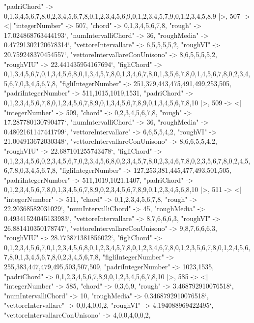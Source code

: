 \documentclass[
]{article}
\begin{document}
\begin{DatasetVerbatim}
    "padriChord" -> {{0,1,3,4,5,6,7,8},{0,2,3,4,5,6,7,8},{0,1,2,3,4,5,6,9},{0,1,2,3,4,5,7,9},{0,1,2,3,4,5,8,9}}
  |>,
  507 -> <|
    "integerNumber" -> 507,
    "chord" -> {0,1,3,4,5,6,7,8},
    "rough" -> 17.024868763444193`,
    "numIntervalliChord" -> 36,
    "roughMedia" -> 0.47291302120678314`,
    "vettoreIntervallare" -> {6,5,5,5,5,2},
    "roughVI" -> 20.759248370454557`,
    "vettoreIntervallareConUnisono" -> {8,6,5,5,5,5,2},
    "roughVIU" -> 22.441435954167694`,
    "figliChord" -> {{0,1,3,4,5,6,7},{0,1,3,4,5,6,8},{0,1,3,4,5,7,8},{0,1,3,4,6,7,8},{0,1,3,5,6,7,8},{0,1,4,5,6,7,8},{0,2,3,4,5,6,7},{0,3,4,5,6,7,8}},
    "figliIntegerNumber" -> {251,379,443,475,491,499,253,505},
    "padriIntegerNumber" -> {511,1015,1019,1531},
    "padriChord" -> {{0,1,2,3,4,5,6,7,8},{0,1,2,4,5,6,7,8,9},{0,1,3,4,5,6,7,8,9},{0,1,3,4,5,6,7,8,10}}
  |>,
  509 -> <|
    "integerNumber" -> 509,
    "chord" -> {0,2,3,4,5,6,7,8},
    "rough" -> 17.287780130790477`,
    "numIntervalliChord" -> 36,
    "roughMedia" -> 0.4802161147441799`,
    "vettoreIntervallare" -> {6,6,5,5,4,2},
    "roughVI" -> 21.004913672030348`,
    "vettoreIntervallareConUnisono" -> {8,6,6,5,5,4,2},
    "roughVIU" -> 22.687101255743478`,
    "figliChord" -> {{0,1,2,3,4,5,6},{0,2,3,4,5,6,7},{0,2,3,4,5,6,8},{0,2,3,4,5,7,8},{0,2,3,4,6,7,8},{0,2,3,5,6,7,8},{0,2,4,5,6,7,8},{0,3,4,5,6,7,8}},
    "figliIntegerNumber" -> {127,253,381,445,477,493,501,505},
    "padriIntegerNumber" -> {511,1019,1021,1407},
    "padriChord" -> {{0,1,2,3,4,5,6,7,8},{0,1,3,4,5,6,7,8,9},{0,2,3,4,5,6,7,8,9},{0,1,2,3,4,5,6,8,10}}
  |>,
  511 -> <|
    "integerNumber" -> 511,
    "chord" -> {0,1,2,3,4,5,6,7,8},
    "rough" -> 22.20368582031029`,
    "numIntervalliChord" -> 45,
    "roughMedia" -> 0.49341524045133983`,
    "vettoreIntervallare" -> {8,7,6,6,6,3},
    "roughVI" -> 26.881410350178747`,
    "vettoreIntervallareConUnisono" -> {9,8,7,6,6,6,3},
    "roughVIU" -> 28.773871381856022`,
    "figliChord" -> {{0,1,2,3,4,5,6,7},{0,1,2,3,4,5,6,8},{0,1,2,3,4,5,7,8},{0,1,2,3,4,6,7,8},{0,1,2,3,5,6,7,8},{0,1,2,4,5,6,7,8},{0,1,3,4,5,6,7,8},{0,2,3,4,5,6,7,8}},
    "figliIntegerNumber" -> {255,383,447,479,495,503,507,509},
    "padriIntegerNumber" -> {1023,1535},
    "padriChord" -> {{0,1,2,3,4,5,6,7,8,9},{0,1,2,3,4,5,6,7,8,10}}
  |>,
  585 -> <|
    "integerNumber" -> 585,
    "chord" -> {0,3,6,9},
    "rough" -> 3.468792910076518`,
    "numIntervalliChord" -> 10,
    "roughMedia" -> 0.3468792910076518`,
    "vettoreIntervallare" -> {0,0,4,0,0,2},
    "roughVI" -> 4.194088969422495`,
    "vettoreIntervallareConUnisono" -> {4,0,0,4,0,0,2},

\end{DatasetVerbatim}
\end{document}
